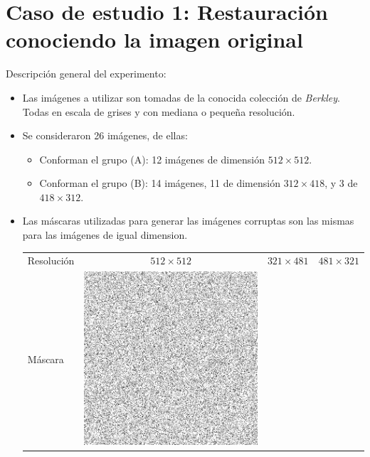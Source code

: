 \section{Caso de estudio 1: Restauraci\'on conociendo la imagen original}

Descripci\'on general del experimento:
\begin{itemize}
	\item Las im\'agenes a utilizar son tomadas de la conocida colecci\'on de \textit{Berkley}. Todas en escala de grises y con mediana o pequeña resoluci\'on.
	\item Se consideraron 26 im\'agenes, de ellas:
	\begin{itemize}
		\item Conforman el grupo (A): 12 im\'agenes de dimensi\'on $512 \times 512$.
		\item Conforman el grupo (B): 14 im\'agenes, 11 de dimensi\'on $312 \times 418$, y 3 de $418 \times 312$.
	\end{itemize}
	\item Las m\'ascaras utilizadas para generar las im\'agenes corruptas son las mismas para las im\'agenes de igual dimension.
	\begin{table}[H]
		\centering
		\begin{tabular}{|l|ccc|}\hline
		Resoluci\'on & $512 \times 512$ & $321 \times 481$ & $481 \times 321$ \\
		M\'ascara &
		\includegraphics[scale=0.2]{Experiments/mask_512_512.tif} &

\end{tabular}
\end{table}
\end{itemize}
